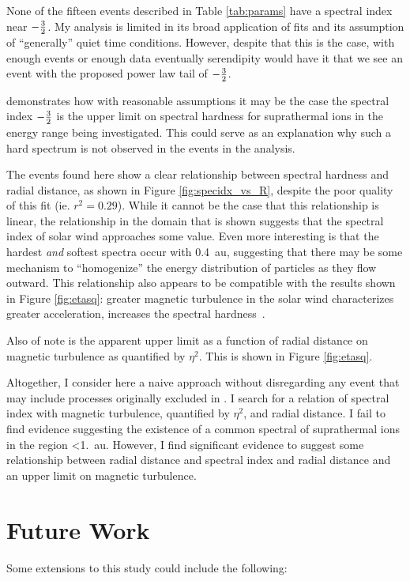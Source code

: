 \documentclass[letterpaper,11pt]{article}
\begin{document}
None of the fifteen events described in Table \ref{tab:params} have a spectral index near $-{3 \over 2}$.  My analysis is limited in its broad application of fits and its assumption of ``generally'' quiet time conditions.  However, despite that this is the case, with enough events or enough data eventually serendipity would have it that we see an event with the proposed power law tail of $-{3 \over 2}$.

\citet{Schwadron2019AGU} demonstrates how with reasonable assumptions it may be the case the spectral index $-{3 \over 2}$ is the upper limit on spectral hardness for suprathermal ions in the energy range being investigated.  This could serve as an explanation why such a hard spectrum is not observed in the events in the analysis.

The events found here show a clear relationship between spectral hardness and radial distance, as shown in Figure \ref{fig:specidx_vs_R}, despite the poor quality of this fit (ie. $r^2 = 0.29$).  While it cannot be the case that this relationship is linear, the relationship in the domain that is shown suggests that the spectral index of solar wind approaches some value.  Even more interesting is that the hardest \textit{and} softest spectra occur with \SI{0.4}{\astronomicalunit}, suggesting that there may be some mechanism to ``homogenize'' the energy distribution of particles as they flow outward.  This relationship also appears to be compatible with the results shown in Figure \ref{fig:etasq}: greater magnetic turbulence in the solar wind characterizes greater acceleration, increases the spectral hardness~\citep{Fisk2008}.

Also of note is the apparent upper limit as a function of radial distance on magnetic turbulence as quantified by $\eta^2$.  This is shown in Figure \ref{fig:etasq}.

Altogether, I consider here a naive approach without disregarding any event that may include processes originally excluded in \citet{Fisk2008}.  I search for a relation of spectral index with magnetic turbulence, quantified by $\eta^2$, and radial distance.  I fail to find evidence suggesting the existence of a common spectral of suprathermal ions in the region \SI{<1.}{\astronomicalunit}.  However, I find significant evidence to suggest some relationship between radial distance and spectral index and radial distance and an upper limit on magnetic turbulence.



\section{Future Work}
\label{sec:future}
Some extensions to this study could include the following:
\end{document}
